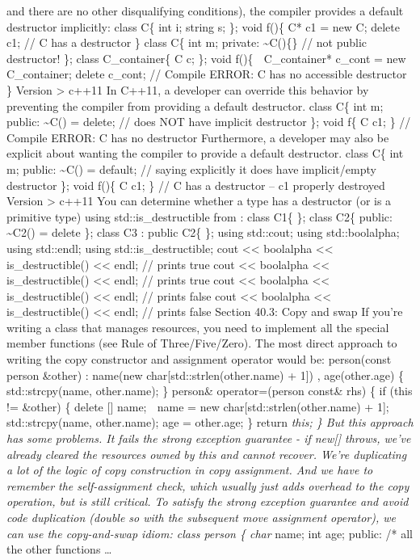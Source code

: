 and there are no other disqualifying conditions), the compiler provides
a default destructor implicitly: class C\{ int i; string s; \}; void
f()\{ C* c1 = new C; delete c1; // C has a destructor \} class C\{ int
m; private: \textasciitilde C()\{\} // not public destructor! \}; class
C\_container\{ C c; \}; void f()\{  C\_container* c\_cont = new
C\_container; delete c\_cont; // Compile ERROR: C has no accessible
destructor \} Version \textgreater{} c++11 In C++11, a developer can
override this behavior by preventing the compiler from providing a
default destructor. class C\{ int m; public: \textasciitilde C() =
delete; // does NOT have implicit destructor \}; void f\{ C c1; \} //
Compile ERROR: C has no destructor Furthermore, a developer may also be
explicit about wanting the compiler to provide a default destructor.
class C\{ int m; public: \textasciitilde C() = default; // saying
explicitly it does have implicit/empty destructor \}; void f()\{ C c1;
\} // C has a destructor -- c1 properly destroyed Version \textgreater{}
c++11 You can determine whether a type has a destructor (or is a
primitive type) using std::is\_destructible from : class C1\{ \}; class
C2\{ public: \textasciitilde C2() = delete \}; class C3 : public C2\{
\}; using std::cout; using std::boolalpha; using std::endl; using
std::is\_destructible; cout \textless\textless{} boolalpha
\textless\textless{} is\_destructible() \textless\textless{} endl; //
prints true cout \textless\textless{} boolalpha \textless\textless{}
is\_destructible() \textless\textless{} endl; // prints true cout
\textless\textless{} boolalpha \textless\textless{} is\_destructible()
\textless\textless{} endl; // prints false cout \textless\textless{}
boolalpha \textless\textless{} is\_destructible() \textless\textless{}
endl; // prints false Section 40.3: Copy and swap If you're writing a
class that manages resources, you need to implement all the special
member functions (see Rule of Three/Five/Zero). The most direct approach
to writing the copy constructor and assignment operator would be:
person(const person \&other) : name(new char{[}std::strlen(other.name) +
1{]}) , age(other.age) \{ std::strcpy(name, other.name); \} person\&
operator=(person const\& rhs) \{ if (this != \&other) \{ delete {[}{]}
name;  name = new char{[}std::strlen(other.name) + 1{]};
std::strcpy(name, other.name); age = other.age; \} return \emph{this; \}
But this approach has some problems. It fails the strong exception
guarantee - if new{[}{]} throws, we've already cleared the resources
owned by this and cannot recover. We're duplicating a lot of the logic
of copy construction in copy assignment. And we have to remember the
self-assignment check, which usually just adds overhead to the copy
operation, but is still critical. To satisfy the strong exception
guarantee and avoid code duplication (double so with the subsequent move
assignment operator), we can use the copy-and-swap idiom: class person
\{ char} name; int age; public: /* all the other functions \ldots{}
